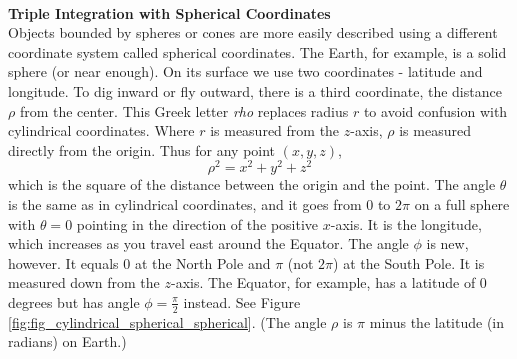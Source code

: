 \\


\noindent\textbf{\large Triple Integration with Spherical Coordinates}\\

Objects bounded by spheres or cones are more easily described using a different coordinate system called spherical coordinates.  The Earth, for example, is a solid sphere (or near enough). On its surface we use two coordinates - latitude and longitude. To dig inward or fly outward, there is a third coordinate, the distance $\rho$ from the center. This Greek letter \textit{rho} replaces radius $r$ to avoid confusion with cylindrical coordinates. Where $r$ is measured from the $z$-axis, $\rho$ is measured directly from the origin. Thus for any point $(x,y,z)$,
$$\rho^2 = x^2 + y^2 + z^2$$
which is the square of the distance between the origin and the point. The angle $\theta$ is the same as in cylindrical coordinates, and it goes from $0$ to $2\pi$ on a full sphere with $\theta = 0$ pointing in the direction of the positive $x$-axis. It is the longitude, which increases as you travel east around the Equator. The angle $\phi$ is new, however. It equals $0$ at the North Pole and $\pi$ (not $2\pi$) at the South Pole. It is measured down from the $z$-axis. The Equator, for example, has a latitude of $0$ degrees but has angle $\phi = \frac{\pi}{2}$ instead. See Figure \ref{fig:fig_cylindrical_spherical_spherical}.  (The angle $\rho$ is $\pi$ minus the latitude (in radians) on Earth.)

